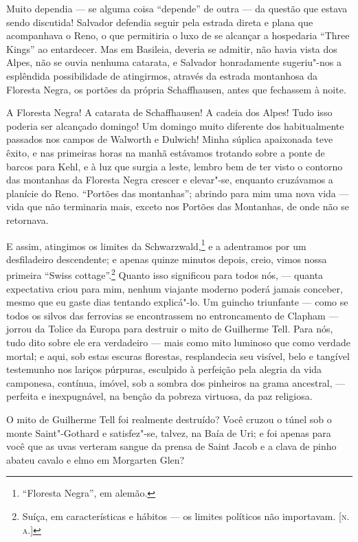 Muito dependia --- se alguma coisa ``depende'' de outra --- da
questão que estava sendo discutida! Salvador defendia seguir pela
estrada direta e plana que acompanhava o Reno, o que permitiria o luxo
de se alcançar a hospedaria ``Three Kings'' ao entardecer. Mas em
Basileia, deveria se admitir, não havia vista dos Alpes, não se ouvia
nenhuma catarata, e Salvador honradamente sugeriu"-nos a esplêndida
possibilidade de atingirmos, através da estrada montanhosa da Floresta
Negra, os portões da própria Schaffhausen, antes que fechassem à noite.

A Floresta Negra! A catarata de Schaffhausen! A cadeia dos Alpes! Tudo
isso poderia ser alcançado domingo! Um domingo muito diferente dos
habitualmente passados nos campos de Walworth e Dulwich! Minha súplica
apaixonada teve êxito, e nas primeiras horas na manhã estávamos trotando
sobre a ponte de barcos para Kehl, e à luz que surgia a leste, lembro
bem de ter visto o contorno das montanhas da Floresta Negra crescer e
elevar"-se, enquanto cruzávamos a planície do Reno. ``Portões das
montanhas''; abrindo para mim uma nova vida --- vida que não terminaria
mais, exceto nos Portões das Montanhas, de onde não se retornava.

E assim, atingimos os limites da Schwarzwald,\footnote{``Floresta
  Negra'', em alemão.} e a adentramos por um
desfiladeiro descendente; e apenas quinze minutos depois, creio, vimos
nossa primeira ``Swiss cottage''.\footnote{Suíça, em características e
  hábitos --- os limites políticos não importavam. {[}\textsc{n.\,a.}{]}}
Quanto isso significou para todos nós, --- quanta expectativa criou para
mim, nenhum viajante moderno poderá jamais conceber, mesmo que eu gaste
dias tentando explicá"-lo. Um guincho triunfante --- como se todos os
silvos das ferrovias se encontrassem no entroncamento de Clapham ---
jorrou da Tolice da Europa para destruir o mito de Guilherme Tell. Para
nós, tudo dito sobre ele era verdadeiro --- mais como mito luminoso que
como verdade mortal; e aqui, sob estas escuras florestas, resplandecia
seu visível, belo e tangível testemunho nos lariços púrpuras, esculpido
à perfeição pela alegria da vida camponesa, contínua, imóvel, sob a
sombra dos pinheiros na grama ancestral, --- perfeita e inexpugnável, na
benção da pobreza virtuosa, da paz religiosa.

O mito de Guilherme Tell foi realmente destruído? Você cruzou o túnel
sob o monte Saint"-Gothard e satisfez"-se, talvez, na Baía de Uri; e foi
apenas para você que as uvas verteram sangue da prensa de Saint Jacob e
a clava de pinho abateu cavalo e elmo em Morgarten Glen?

